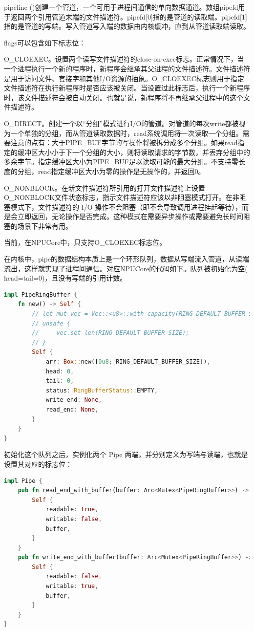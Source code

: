 pipeline ()创建一个管道，一个可用于进程间通信的单向数据通道。数组pipefd用于返回两个引用管道末端的文件描述符。pipefd[0]指的是管道的读取端。pipefd[1]指的是管道的写端。写入管道写入端的数据由内核缓冲，直到从管道读取端读取。

flags可以包含如下标志位：

O_CLOEXEC。设置两个读写文件描述符的close-on-exec标志。正常情况下，当一个进程执行一个新的程序时，新程序会继承其父进程的文件描述符。文件描述符是用于访问文件、套接字和其他I/O资源的抽象。O_CLOEXEC标志则用于指定文件描述符在执行新程序时是否应该被关闭。当设置过此标志后，执行一个新程序时，该文件描述符会被自动关闭。也就是说，新程序将不再继承父进程中的这个文件描述符。
              
O_DIRECT。创建一个以“分组”模式进行I/O的管道。对管道的每次write都被视为一个单独的分组，而从管道读取数据时，read系统调用将一次读取一个分组。需要注意的点有：大于PIPE_BUF字节的写操作将被拆分成多个分组。如果read指定的缓冲区大小小于下一个分组的大小，则将读取请求的字节数，并丢弃分组中的多余字节。指定缓冲区大小为PIPE_BUF足以读取可能的最大分组。不支持零长度的分组，read指定缓冲区大小为零的操作是无操作的，并返回0。

O_NONBLOCK。在新文件描述符所引用的打开文件描述符上设置O_NONBLOCK文件状态标志，指示文件描述符应该以非阻塞模式打开。在非阻塞模式下，文件描述符的 I/O 操作不会阻塞（即不会导致调用进程挂起等待），而是会立即返回，无论操作是否完成。这种模式在需要异步操作或需要避免长时间阻塞的场景下非常有用。

当前，在NPUCore中，只支持O_CLOEXEC标志位。

在内核中，pipe的数据结构本质上是一个环形队列，数据从写端流入管道，从读端流出，这样就实现了进程间通信。对应NPUCore的代码如下。队列被初始化为空( head=tail=0)，且没有写端的引⽤计数。
\begin{lstlisting}[language=rust]
    impl PipeRingBuffer {
    fn new() -> Self {
        // let mut vec = Vec::<u8>::with_capacity(RING_DEFAULT_BUFFER_SIZE);
        // unsafe {
        //     vec.set_len(RING_DEFAULT_BUFFER_SIZE);
        // }
        Self {
            arr: Box::new([0u8; RING_DEFAULT_BUFFER_SIZE]),
            head: 0,
            tail: 0,
            status: RingBufferStatus::EMPTY,
            write_end: None,
            read_end: None,
        }
    }
}
\end{lstlisting}

初始化这个队列之后，实例化两个 Pipe 两端，并分别定义为写端与读端，也就是设置其对应的标志位：
\begin{lstlisting}[language=rust]
    impl Pipe {
    pub fn read_end_with_buffer(buffer: Arc<Mutex<PipeRingBuffer>>) -> Self {
        Self {
            readable: true,
            writable: false,
            buffer,
        }
    }
    pub fn write_end_with_buffer(buffer: Arc<Mutex<PipeRingBuffer>>) -> Self {
        Self {
            readable: false,
            writable: true,
            buffer,
        }
    }
}
\end{lstlisting}

